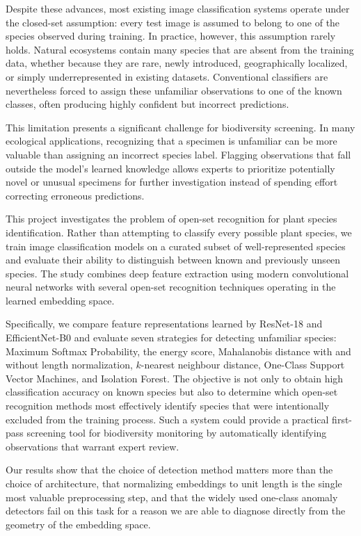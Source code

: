 \documentclass[11pt]{article}
\begin{document}
Despite these advances, most existing image classification systems operate under the closed-set assumption: every test image is assumed to belong to one of the species observed during training. In practice, however, this assumption rarely holds. Natural ecosystems contain many species that are absent from the training data, whether because they are rare, newly introduced, geographically localized, or simply underrepresented in existing datasets. Conventional classifiers are nevertheless forced to assign these unfamiliar observations to one of the known classes, often producing highly confident but incorrect predictions.

This limitation presents a significant challenge for biodiversity screening. In many ecological applications, recognizing that a specimen is unfamiliar can be more valuable than assigning an incorrect species label. Flagging observations that fall outside the model's learned knowledge allows experts to prioritize potentially novel or unusual specimens for further investigation instead of spending effort correcting erroneous predictions.

This project investigates the problem of open-set recognition for plant species identification. Rather than attempting to classify every possible plant species, we train image classification models on a curated subset of well-represented species and evaluate their ability to distinguish between known and previously unseen species. The study combines deep feature extraction using modern convolutional neural networks with several open-set recognition techniques operating in the learned embedding space.

Specifically, we compare feature representations learned by ResNet-18 and EfficientNet-B0 and evaluate seven strategies for detecting unfamiliar species: Maximum Softmax Probability, the energy score, Mahalanobis distance with and without length normalization, $k$-nearest neighbour distance, One-Class Support Vector Machines, and Isolation Forest. The objective is not only to obtain high classification accuracy on known species but also to determine which open-set recognition methods most effectively identify species that were intentionally excluded from the training process. Such a system could provide a practical first-pass screening tool for biodiversity monitoring by automatically identifying observations that warrant expert review.

Our results show that the choice of detection method matters more than the choice of architecture, that normalizing embeddings to unit length is the single most valuable preprocessing step, and that the widely used one-class anomaly detectors fail on this task for a reason we are able to diagnose directly from the geometry of the embedding space.
\end{document}
